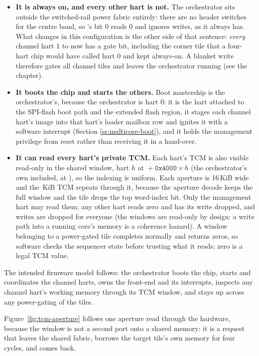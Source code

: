 \begin{itemize}
	\item \textbf{It is always on, and every other hart is not.} The orchestrator sits outside the switched-rail power fabric entirely: there are no header switches for the centre band, so 's bit 0 reads 0 and ignores writes, as it always has. What changes in this configuration is the other side of that sentence: \emph{every} channel hart 1 to \MaxHartIndex{} now has a gate bit, including the corner tile that a four-hart chip would have called hart 0 and kept always-on. A blanket  write therefore gates all \MaxHartIndex{} channel tiles and leaves the orchestrator running (see the  chapter).
	\item \textbf{It boots the chip and starts the others.} Boot mastership is the orchestrator's, because the orchestrator is hart 0: it is the hart attached to the SPI-flash boot path and the extended flash region, it stages each channel hart's image into that hart's loader mailbox row and ignites it with a  software interrupt (Section \ref{ss:multicore-boot}), and it holds the management privilege from reset rather than receiving it in a hand-over.
	\item \textbf{It can read every hart's private TCM.} Each hart's TCM is also visible read-only in the shared window, hart $h$ at \texttt{\FirstTcmWindowAddress}${} + \texttt{0x4000} \times h$ (the orchestrator's own included, at \texttt{\FirstTcmWindowAddress}), so the indexing is uniform. Each aperture is 16\,KiB wide and the \TcmSizeKiB\,KiB TCM repeats through it, because the aperture decode keeps the full window and the tile drops the top word-index bit. Only the management hart may read them; any other hart reads zero and has its write dropped, and writes are dropped for everyone (the windows are read-only by design: a write path into a running core's memory is a coherence hazard). A window belonging to a power-gated tile completes normally and returns zeros, so software checks the  sequencer state before trusting what it reads; zero is a legal TCM value.
\end{itemize}

The intended firmware model follows: the orchestrator boots the chip, starts and coordinates the channel harts, owns the front-end and its interrupts, inspects any channel hart's working memory through its TCM window, and stays up across any power-gating of the tiles.

Figure~\ref{fig:tcm-aperture} follows one aperture read through the hardware, because the window is not a second port onto a shared memory: it is a request that leaves the shared fabric, borrows the target tile's own memory for four cycles, and comes back.

